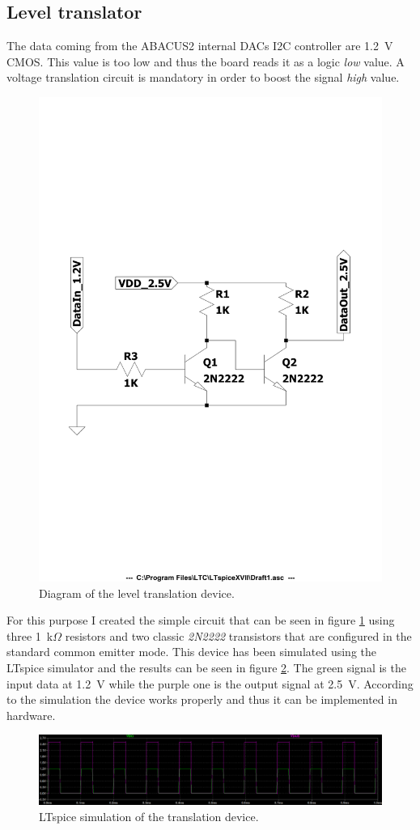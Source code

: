 \subsection{Level translator}\label{leveltranslator}
The data coming from the ABACUS2 internal DACs I2C controller are 1.2~V CMOS. This value is too low and thus the board reads it as a logic \textit{low} value. A voltage translation circuit is mandatory in order to boost the signal \textit{high} value.
\begin{figure}[H]
	\centering
	\includegraphics[width=0.6\linewidth]{IMG/ch5/DIAGRAM}
	\caption{Diagram of the level translation device.}
	\label{fig:diagram}
\end{figure}
\noindent For this purpose I created the simple circuit that can be seen in figure \ref{fig:diagram} using three 1~k$\Omega$ resistors and two classic \textit{2N2222} transistors that are configured in the standard common emitter mode.
This device has been simulated using the LTspice simulator and the results can be seen in figure \ref{fig:transsimulation}.
The green signal is the input data at 1.2~V while the purple one is the output signal at 2.5~V.
According to the simulation the device works properly and thus it can be implemented in hardware.
\begin{figure}[H]
	\centering
	\includegraphics[width=1\linewidth]{IMG/ch5/TRANSSIMULATION}
	\caption{LTspice simulation of the translation device.}
	\label{fig:transsimulation}
\end{figure}
